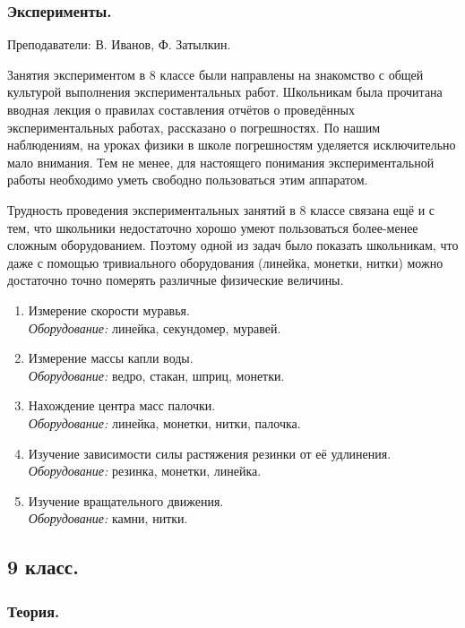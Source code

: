 \documentclass[12pt,a4paper,oneside]{scrartcl}
\begin{document}
\subsubsection{Эксперименты.}
\label{sec:daily_8_exp}

\textsf{Преподаватели: В. Иванов, Ф. Затылкин.}

Занятия экспериментом в 8 классе были направлены на знакомство с общей
культурой выполнения экспериментальных работ. Школьникам была
прочитана вводная лекция о правилах составления отчётов о проведённых
экспериментальных работах, рассказано о погрешностях. По нашим
наблюдениям, на уроках физики в школе погрешностям уделяется
исключительно мало внимания. Тем не менее, для настоящего понимания
экспериментальной работы необходимо уметь свободно пользоваться этим
аппаратом.

Трудность проведения экспериментальных занятий в 8 классе связана ещё
и с тем, что школьники недостаточно хорошо умеют пользоваться
более-менее сложным оборудованием. Поэтому одной из задач было
показать школьникам, что даже с помощью тривиального оборудования
(линейка, монетки, нитки) можно достаточно точно померять различные
физические величины. 

\begin{enumerate}
\item Измерение скорости муравья.  \\ \textit{Оборудование:} линейка,
  секундомер, муравей.
\item Измерение массы капли воды. \\ \textit{Оборудование:} ведро,
  стакан, шприц, монетки.
\item Нахождение центра масс палочки. \\ \textit{Оборудование:}
  линейка, монетки, нитки, палочка.
\item Изучение зависимости силы растяжения резинки от её удлинения. \\
  \textit{Оборудование:} резинка, монетки, линейка.
\item Изучение вращательного движения. \\ \textit{Оборудование:}
  камни, нитки. 
\end{enumerate}

\subsection{9 класс.}
\label{sec:daily_9}

\subsubsection{Теория.}
\label{sec:daily_9_th}
\end{document}
